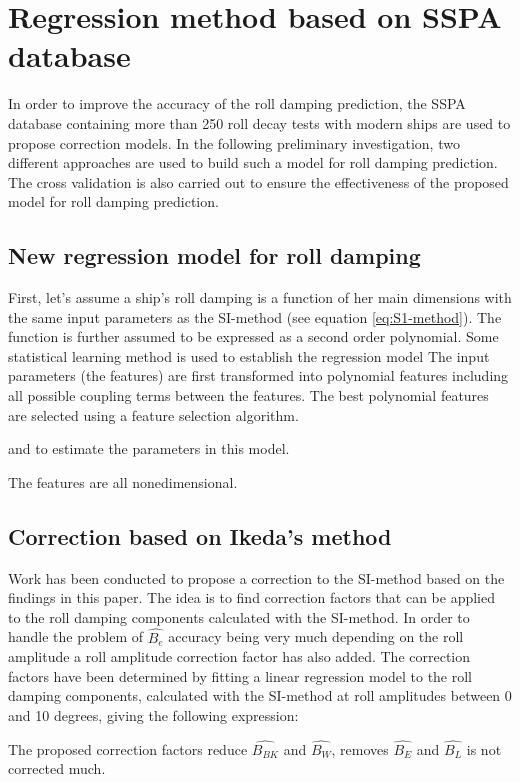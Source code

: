 \section{Regression method based on SSPA database}
\label{se:correction_SI_method}
In order to improve the accuracy of the roll damping prediction, the SSPA database containing more than 250 roll decay tests with modern ships are used to propose correction models. In the following preliminary investigation, two different approaches are used to build such a model for roll damping prediction. The cross validation is also carried out to ensure the effectiveness of the proposed model for roll damping prediction.

\subsection{New regression model for roll damping}
First, let's assume a ship's roll damping is a function of her main dimensions with the same input parameters as the SI-method (see equation \ref{eq:S1-method}). The function is further assumed to be expressed as a second order polynomial. Some statistical learning method is used to establish the regression model  The input parameters (the features) are first transformed into polynomial features including all possible coupling terms between the features. The best polynomial features are selected using a feature selection algorithm.

and to estimate the parameters in this model.


The features are all nonedimensional.

\subsection{Correction based on Ikeda's method}
Work has been conducted to propose a correction to the SI-method based on the findings in this paper. The idea is to find correction factors that can be applied to the roll damping components calculated with the SI-method. In order to handle the problem of $\hat{B_e}$ accuracy being very much depending on the roll amplitude a roll amplitude correction factor has also added. The correction factors have been determined by fitting a linear regression model to the roll damping components, calculated with the SI-method at roll amplitudes between 0 and 10 degrees, giving the following expression: 

The proposed correction factors reduce $\hat{B_{BK}}$ and $\hat{B_{W}}$, removes $\hat{B_{E}}$ and $\hat{B_{L}}$ is not corrected much.

